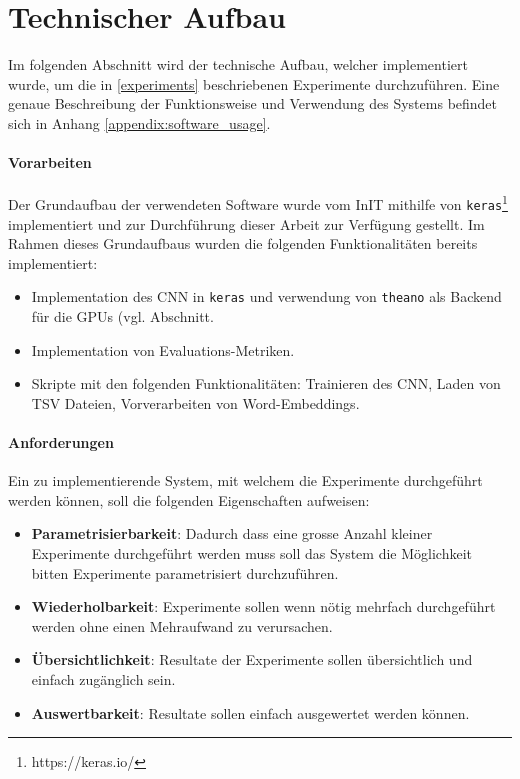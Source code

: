 \section{Technischer Aufbau}
Im folgenden Abschnitt wird der technische Aufbau, welcher implementiert wurde, um die in \ref{experiments} beschriebenen Experimente durchzuführen. Eine genaue Beschreibung der Funktionsweise und Verwendung des Systems befindet sich in Anhang \ref{appendix:software_usage}.

\paragraph{Vorarbeiten}
\label{technichal_setup:prework}
Der Grundaufbau der verwendeten Software wurde vom InIT mithilfe von \texttt{keras}\footnote{https://keras.io/} implementiert und zur Durchführung dieser Arbeit zur Verfügung gestellt. Im Rahmen dieses Grundaufbaus wurden die folgenden Funktionalitäten bereits implementiert:

\begin{itemize}[noitemsep]
	\item Implementation des CNN in \texttt{keras} und verwendung von \texttt{theano} \cite{theanoCitShort} als Backend für die \gls{GPU}s (vgl. Abschnitt.
	\item Implementation von Evaluations-Metriken.
	\item Skripte mit den folgenden Funktionalitäten: Trainieren des CNN, Laden von TSV Dateien, Vorverarbeiten von Word-Embeddings.
\end{itemize}

\paragraph{Anforderungen}
\label{technical_setup:requirements}
Ein zu implementierende System, mit welchem die Experimente durchgeführt werden können, soll die folgenden Eigenschaften aufweisen:

\begin{itemize}
	\item \textbf{Parametrisierbarkeit}: Dadurch dass eine grosse Anzahl kleiner Experimente durchgeführt werden muss soll das System die Möglichkeit bitten Experimente parametrisiert durchzuführen.
	\item \textbf{Wiederholbarkeit}: Experimente sollen wenn nötig mehrfach durchgeführt werden ohne einen Mehraufwand zu verursachen. 
	\item \textbf{Übersichtlichkeit}: Resultate der Experimente sollen übersichtlich und einfach zugänglich sein.
	\item \textbf{Auswertbarkeit}: Resultate sollen  einfach ausgewertet werden können.
\end{itemize}

